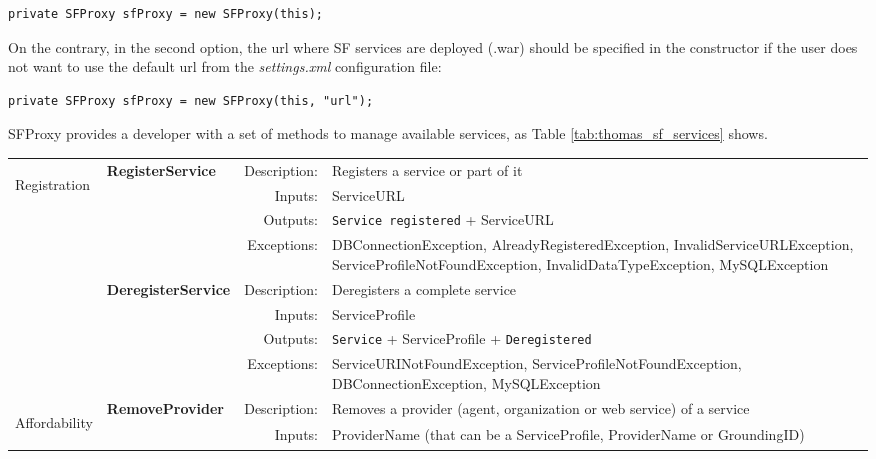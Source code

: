 \begin{lstlisting}
private SFProxy sfProxy = new SFProxy(this);
\end{lstlisting}

On the contrary, in the second option, the url where SF services are deployed (.war) should be specified in the constructor if the user does not want to use the default url from the \textit{settings.xml} configuration file:

\begin{lstlisting}
private SFProxy sfProxy = new SFProxy(this, "url");
\end{lstlisting}


SFProxy provides a developer with a set of methods to manage available services, as Table \ref{tab:thomas_sf_services} shows.

\begin{longtable}{|p{0.5cm}||p{3cm}|r|p{8cm}|}
  \hline
  \multirow{8}{*}{\begin{turn}{90}Registration\end{turn}} & \multirow{4}{*}{\textbf{RegisterService}} & Description: & Registers a service or part of it \\ \cline{3-4}
    &  & Inputs: & ServiceURL \\ \cline{3-4}
    &  & Outputs: & \texttt{Service registered} + ServiceURL \\ \cline{3-4}
    &  & Exceptions: & DBConnectionException, AlreadyRegisteredException, InvalidServiceURLException, ServiceProfileNotFoundException, InvalidDataTypeException, MySQLException \\ \cline{2-4}
    & \multirow{4}{*}{\textbf{DeregisterService}} & Description: & Deregisters a complete service \\ \cline{3-4}
    &  & Inputs: & ServiceProfile \\ \cline{3-4}
    &  & Outputs: & \texttt{Service} + ServiceProfile + \texttt{Deregistered} \\ \cline{3-4} 
    &  & Exceptions: & ServiceURINotFoundException, ServiceProfileNotFoundException, DBConnectionException, MySQLException\\ \hline
  \hline
  \multirow{4}{*}{\begin{turn}{90}Affordability\end{turn}} & \multirow{4}{*}{\textbf{RemoveProvider}} & Description: & Removes a provider (agent, organization or web service) of a service \\ \cline{3-4}
    &  & Inputs: & ProviderName (that can be a ServiceProfile, ProviderName or GroundingID) \\ \cline{3-4}

\end{longtable}
